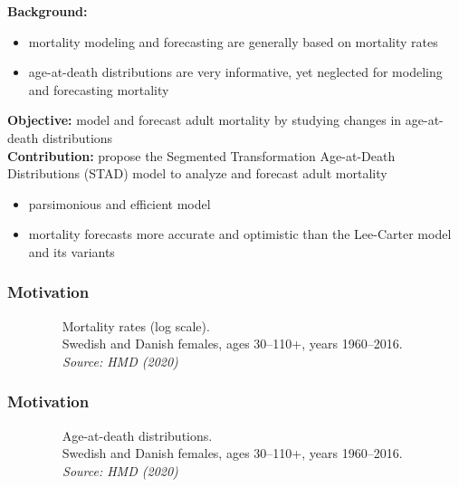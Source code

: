\documentclass[12pt, xcolor=table]{beamer}  %
\begin{document}
\begin{frame} 
	\textbf{Background:}
	\begin{itemize}
		\setlength\itemsep{0.5em}
		\item mortality modeling and forecasting are generally based on mortality rates 
		\item age-at-death distributions are very informative, yet neglected for modeling and forecasting mortality
	\end{itemize}
	\bigskip \pause
	\textbf{Objective:} model and forecast adult mortality by studying changes in age-at-death distributions 
	\\ \bigskip \pause
	\textbf{Contribution:} propose the Segmented Transformation Age-at-Death Distributions (STAD) model to analyze and forecast adult mortality
	\begin{itemize}
		\setlength\itemsep{0.5em}
		\item parsimonious and efficient model 
		\item mortality forecasts more accurate and optimistic than the Lee-Carter model and its variants
	\end{itemize}
	
\end{frame}

\begin{frame}\frametitle{Motivation}
\vspace{-0.2cm}
\begin{center}
\end{center}
\vspace{-0.3cm}
\tiny{$\quad\quad\quad\quad$ Mortality rates (log scale). \\ $\quad\quad\quad\quad$ Swedish and Danish females, ages 30--110+, years 1960--2016. \\ \emph{$\quad\quad\quad\quad$ Source: HMD (2020)}}
\end{frame}

\begin{frame}\frametitle{Motivation}
\vspace{-0.2cm}
\begin{center}
\end{center}
\vspace{-0.3cm}
\tiny{$\quad\quad\quad\quad$ Age-at-death distributions. \\ $\quad\quad\quad\quad$ Swedish and Danish females, ages 30--110+, years 1960--2016. \\ \emph{$\quad\quad\quad\quad$ Source: HMD (2020)}}
\end{frame}
\end{document}
